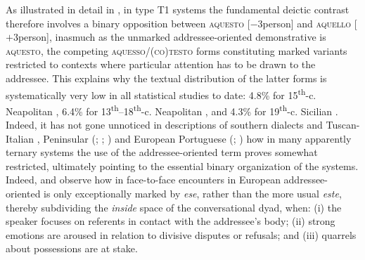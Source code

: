 \documentclass[output=paper]{langsci/langscibook}
\begin{document}
As illustrated in detail in \citet{ledgeway2004sviluppo}, in type T1 systems
the fundamental deictic contrast therefore involves a binary opposition between
\textsc{aquesto} \mbox{[$-$3person]} and \textsc{aquello} [$+$3person], inasmuch as the
unmarked addressee-o\-ri\-en\-ted demonstrative is \textsc{aquesto}, the competing
\textsc{aquesso/(co)testo} forms constituting marked variants restricted to
contexts where particular attention has to be drawn to the addressee. This
explains why the textual distribution of the latter forms is systematically
very low in all statistical studies to date: 4.8\% for
15\textsuperscript{th}\nobreakdash-c. Neapolitan \citep{Vincent:1999ab}, 6.4\% for
13\textsuperscript{th}–18\textsuperscript{th}{}-c. Neapolitan
\citep[89]{ledgeway2004sviluppo}, and 4.3\% for 19\textsuperscript{th}{}-c.
Sicilian \citep[92]{ledgeway2004sviluppo}. Indeed, it has not gone unnoticed
in descriptions of southern  dialects and Tuscan-Italian
\citep[68--70]{ledgeway2004sviluppo}, Peninsular 
(\citealt[fn.\ 31]{Eguren:1999a}; \citealt[558f]{Eguren:2012a};
\citealt{Gutierrez-Rexach:2002a,Gutierrez-Rexach:2005a}) and
European Portuguese (\citealt{Teyssier:1980a}; \citeauthor{Salvi:2011ab}\linebreak\citeyear[325]{Salvi:2011ab})
how in many apparently ternary systems the use of the addressee-oriented term
proves somewhat restricted, ultimately pointing to the essential binary
organization of the systems. Indeed,
\citet[§3.1]{Jungbluth:2017a} and
\citet[245f]{Gomez-Sanchez:2015a} observe how in face-to-face encounters in
European  addressee-oriented  is only exceptionally marked by
\emph{ese}, rather than the more usual \emph{este}, thereby subdividing the
\emph{inside} space of the conversational dyad, when: (i) the speaker focuses
on referents in contact with the addressee’s body; (ii) strong emotions are
aroused in relation to divisive disputes or refusals; and (iii) quarrels about
possessions are at stake.
\end{document}
